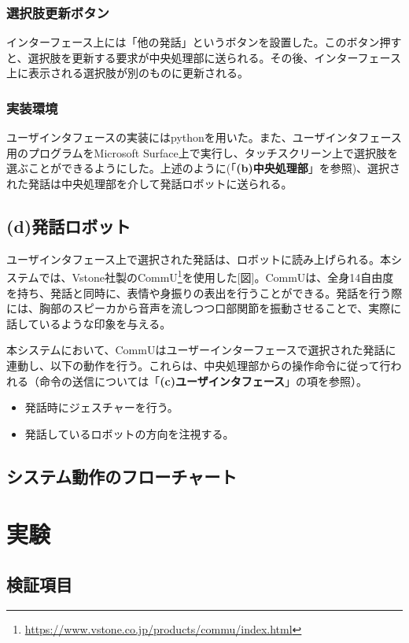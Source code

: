 \documentclass[11pt, a4paper]{jreport} %
\begin{document}
\subsubsection*{選択肢更新ボタン}
インターフェース上には「他の発話」というボタンを設置した。このボタン押すと、選択肢を更新する要求が中央処理部に送られる。その後、インターフェース上に表示される選択肢が別のものに更新される。

\subsubsection*{実装環境}
ユーザインタフェースの実装にはpythonを用いた。また、ユーザインタフェース用のプログラムをMicrosoft Surface上で実行し、タッチスクリーン上で選択肢を選ぶことができるようにした。上述のように(「\textbf{(b)中央処理部}」を参照)、選択された発話は中央処理部を介して発話ロボットに送られる。

\subsection*{(d)発話ロボット}
ユーザインタフェース上で選択された発話は、ロボットに読み上げられる。本システムでは、Vstone社製のCommU\footnote{\url{https://www.vstone.co.jp/products/commu/index.html}}を使用した[図]。CommUは、全身14自由度を持ち、発話と同時に、表情や身振りの表出を行うことができる。発話を行う際には、胸部のスピーカから音声を流しつつ口部関節を振動させることで、実際に話しているような印象を与える。


本システムにおいて、CommUはユーザーインターフェースで選択された発話に連動し、以下の動作を行う。これらは、中央処理部からの操作命令に従って行われる（命令の送信については「\textbf{(c)ユーザインタフェース}」の項を参照）。
\begin{itemize}
\item 発話時にジェスチャーを行う。
\item 発話しているロボットの方向を注視する。
\end{itemize}

\subsection{システム動作のフローチャート}


\section{実験}
\label{sec:実験1}

\subsection{検証項目}
\end{document}
